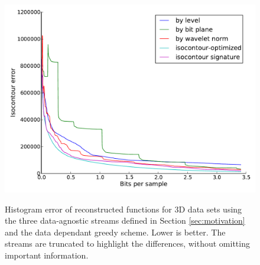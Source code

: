 \begin{figure}
  \centering
 	{\includegraphics[width=0.48\linewidth]{img/motivation-3d/isocontour-turbulence.pdf}}
 	\caption{Histogram error of reconstructed functions for 3D data sets using the three data-agnostic streams
 	defined in Section \ref{sec:motivation} and the data dependant greedy scheme. Lower is better.
        The streams are truncated to highlight
 	the differences, without omitting important information.}
 	\label{fig:motivation-3d-isocontour}
\end{figure}




